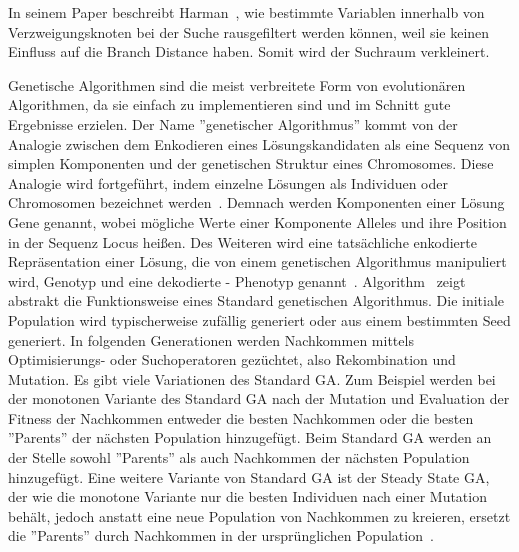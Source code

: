 \documentclass{article}
\begin{document}
In seinem Paper beschreibt Harman~\cite{Harman2002}, wie bestimmte Variablen innerhalb von Verzweigungsknoten bei der Suche rausgefiltert werden können, weil sie keinen Einfluss auf die Branch Distance haben. Somit wird der Suchraum verkleinert.

Genetische Algorithmen sind die meist verbreitete Form von evolutionären Algorithmen, da sie einfach zu implementieren sind und im Schnitt gute Ergebnisse erzielen. Der Name ''genetischer Algorithmus'' kommt von der Analogie zwischen dem Enkodieren eines Lösungskandidaten als eine Sequenz von simplen Komponenten und der genetischen Struktur eines Chromosomes. Diese Analogie wird fortgeführt, indem einzelne Lösungen als Individuen oder Chromosomen bezeichnet werden~\cite{Campos2017}. Demnach werden Komponenten einer Lösung Gene genannt, wobei mögliche Werte einer Komponente Alleles und ihre Position in der Sequenz Locus heißen. Des Weiteren wird eine tatsächliche enkodierte Repräsentation einer Lösung, die von einem genetischen Algorithmus manipuliert wird, Genotyp und eine dekodierte - Phenotyp genannt~\cite{McMinn_2004}. Algorithm~ zeigt abstrakt die Funktionsweise eines Standard genetischen Algorithmus. Die initiale Population wird typischerweise zufällig generiert oder aus einem bestimmten Seed generiert. In folgenden Generationen werden Nachkommen mittels Optimisierungs- oder Suchoperatoren gezüchtet, also Rekombination und Mutation. Es gibt viele Variationen des Standard GA. Zum Beispiel werden bei der monotonen Variante des Standard GA nach der Mutation und Evaluation der Fitness der Nachkommen entweder die besten Nachkommen oder die besten ''Parents'' der nächsten Population hinzugefügt. Beim Standard GA werden an der Stelle sowohl ''Parents'' als auch Nachkommen der nächsten Population hinzugefügt. Eine weitere Variante von Standard GA ist der Steady State GA, der wie die monotone Variante nur die besten Individuen nach einer Mutation behält, jedoch anstatt eine neue Population von Nachkommen zu kreieren, ersetzt die ''Parents'' durch Nachkommen in der ursprünglichen Population~\cite{Campos2017}.
\end{document}

